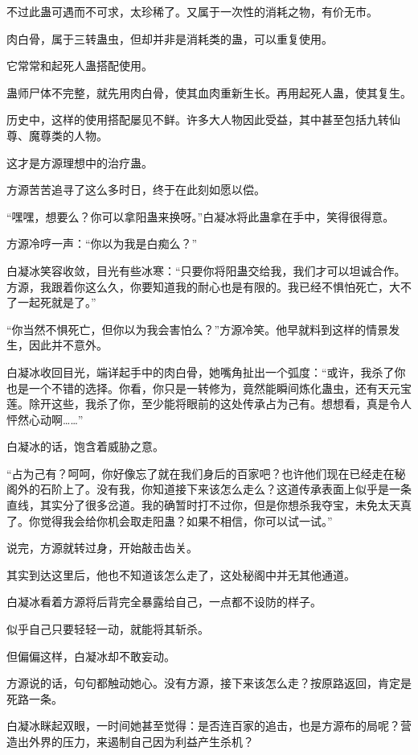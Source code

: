 \begin{this_body}
不过此蛊可遇而不可求，太珍稀了。又属于一次性的消耗之物，有价无市。

肉白骨，属于三转蛊虫，但却并非是消耗类的蛊，可以重复使用。

它常常和起死人蛊搭配使用。

蛊师尸体不完整，就先用肉白骨，使其血肉重新生长。再用起死人蛊，使其复生。

历史中，这样的使用搭配屡见不鲜。许多大人物因此受益，其中甚至包括九转仙尊、魔尊类的人物。

这才是方源理想中的治疗蛊。

方源苦苦追寻了这么多时日，终于在此刻如愿以偿。

“嘿嘿，想要么？你可以拿阳蛊来换呀。”白凝冰将此蛊拿在手中，笑得很得意。

方源冷哼一声：“你以为我是白痴么？”

白凝冰笑容收敛，目光有些冰寒：“只要你将阳蛊交给我，我们才可以坦诚合作。方源，我跟着你这么久，你要知道我的耐心也是有限的。我已经不惧怕死亡，大不了一起死就是了。”

“你当然不惧死亡，但你以为我会害怕么？”方源冷笑。他早就料到这样的情景发生，因此并不意外。

白凝冰收回目光，端详起手中的肉白骨，她嘴角扯出一个弧度：“或许，我杀了你也是一个不错的选择。你看，你只是一转修为，竟然能瞬间炼化蛊虫，还有天元宝莲。除开这些，我杀了你，至少能将眼前的这处传承占为己有。想想看，真是令人怦然心动啊……”

白凝冰的话，饱含着威胁之意。

“占为己有？呵呵，你好像忘了就在我们身后的百家吧？也许他们现在已经走在秘阁外的石阶上了。没有我，你知道接下来该怎么走么？这道传承表面上似乎是一条直线，其实分了很多岔道。我的确暂时打不过你，但是你想杀我夺宝，未免太天真了。你觉得我会给你机会取走阳蛊？如果不相信，你可以试一试。”

说完，方源就转过身，开始敲击齿关。

其实到达这里后，他也不知道该怎么走了，这处秘阁中并无其他通道。

白凝冰看着方源将后背完全暴露给自己，一点都不设防的样子。

似乎自己只要轻轻一动，就能将其斩杀。

但偏偏这样，白凝冰却不敢妄动。

方源说的话，句句都触动她心。没有方源，接下来该怎么走？按原路返回，肯定是死路一条。

白凝冰眯起双眼，一时间她甚至觉得：是否连百家的追击，也是方源布的局呢？营造出外界的压力，来遏制自己因为利益产生杀机？


\end{this_body}
